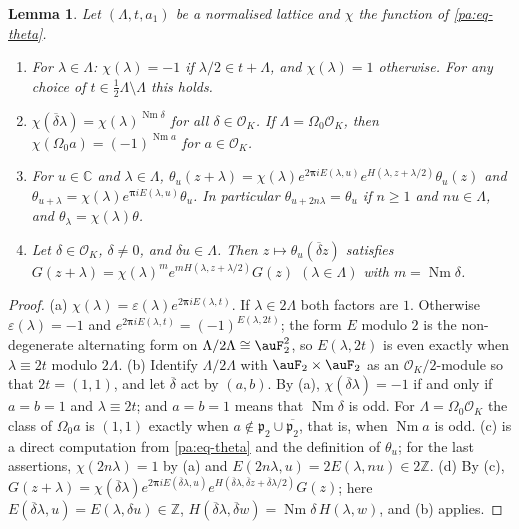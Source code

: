 \documentclass[10pt]{amsart}
\newtheorem{lemma}[theorem]{Lemma}
\theoremstyle{definition}
\theoremstyle{remark}
\newcommand{\C}{\mathbb C}
\newcommand{\Z}{\mathbb Z}
\providecommand{\auNm}{\operatorname{Nm}}
\providecommand{\auO}{\mathcal O}
\providecommand{\aubar}[1]{\overline{#1}}
\begin{document}
\begin{lemma}\label{pf:chi}
Let $(\Lambda,t,a_1)$ be a normalised lattice and $\chi$ the function of \eqref{pa:eq-theta}.
\begin{enumerate}
\item[(a)] For $\lambda\in\Lambda$: $\chi(\lambda)=-1$ if $\lambda/2\in t+\Lambda$, and
$\chi(\lambda)=1$ otherwise. For any choice of $t\in\frac12\Lambda\setminus\Lambda$ this holds.
\item[(b)] $\chi(\aubar\delta\lambda)=\chi(\lambda)^{\auNm\delta}$ for all $\delta\in\auO_K$. If
$\Lambda=\Omega_0\auO_K$, then $\chi(\Omega_0a)=(-1)^{\auNm a}$ for $a\in\auO_K$.
\item[(c)] For $u\in\C$ and $\lambda\in\Lambda$, $\theta_u(z+\lambda)=\chi(\lambda)e^{2\boldsymbol
\pi iE(\lambda,u)}e^{H(\lambda,z+\lambda/2)}\theta_u(z)$ and $\theta_{u+\lambda}=\chi(\lambda)
e^{\boldsymbol\pi iE(\lambda,u)}\theta_u$. In particular $\theta_{u+2n\lambda}=\theta_u$ if
$n\ge1$ and $nu\in\Lambda$, and $\theta_\lambda=\chi(\lambda)\theta$.
\item[(d)] Let $\delta\in\auO_K$, $\delta\ne0$, and $\delta u\in\Lambda$. Then $z\mapsto\theta_u
(\aubar\delta z)$ satisfies $G(z+\lambda)=\chi(\lambda)^{m}e^{mH(\lambda,z+\lambda/2)}G(z)$
$(\lambda\in\Lambda)$ with $m=\auNm\delta$.
\end{enumerate}
\end{lemma}
\begin{proof}
(a) $\chi(\lambda)=\varepsilon(\lambda)e^{2\boldsymbol\pi iE(\lambda,t)}$. If $\lambda\in2\Lambda$
both factors are $1$. Otherwise $\varepsilon(\lambda)=-1$ and $e^{2\boldsymbol\pi iE(\lambda,t)}=
(-1)^{E(\lambda,2t)}$; the form $E$ modulo $2$ is the non-degenerate alternating form on
$\Lambda/2\Lambda\cong\auF_2^2$, so $E(\lambda,2t)$ is even exactly when $\lambda\equiv2t$ modulo
$2\Lambda$. (b) Identify $\Lambda/2\Lambda$ with $\auF_2\times\auF_2$ as an $\auO_K/2$-module so
that $2t=(1,1)$, and let $\aubar\delta$ act by $(a,b)$. By (a), $\chi(\aubar\delta\lambda)=-1$ if
and only if $a=b=1$ and $\lambda\equiv2t$; and $a=b=1$ means that $\auNm\delta$ is odd. For
$\Lambda=\Omega_0\auO_K$ the class of $\Omega_0a$ is $(1,1)$ exactly when $a\notin\mathfrak p_2
\cup\aubar{\mathfrak p_2}$, that is, when $\auNm a$ is odd. (c) is a direct computation from
\eqref{pa:eq-theta} and the definition of $\theta_u$; for the last assertions, $\chi(2n\lambda)=1$
by (a) and $E(2n\lambda,u)=2E(\lambda,nu)\in2\Z$. (d) By (c), $G(z+\lambda)=\chi(\aubar\delta
\lambda)e^{2\boldsymbol\pi iE(\aubar\delta\lambda,u)}e^{H(\aubar\delta\lambda,\aubar\delta z+
\aubar\delta\lambda/2)}G(z)$; here $E(\aubar\delta\lambda,u)=E(\lambda,\delta u)\in\Z$,
$H(\aubar\delta\lambda,\aubar\delta w)=\auNm\delta\,H(\lambda,w)$, and (b) applies.
\end{proof}
\end{document}

